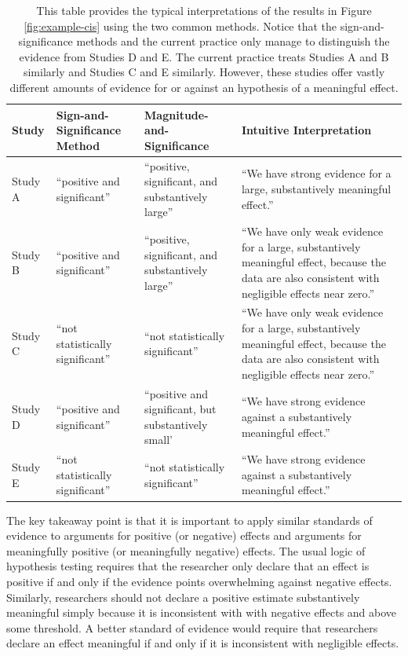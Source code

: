 \documentclass[12pt]{article}
\begin{document}
\renewcommand{\arraystretch}{1.5}
\begin{table}
\begin{center}
\begin{scriptsize}
\begin{tabular}{|>{\centering\arraybackslash}m{.5in}>{\centering\arraybackslash}m{1.75in}>{\centering\arraybackslash}m{1.75in}>{\centering\arraybackslash}
m{1.75in}|}
\hline
Study & Sign-and-Significance Method & Magnitude-and-Significance & Intuitive Interpretation\\ 
\hline
Study A & ``positive and significant'' & ``positive, significant, and substantively large'' & ``We have strong evidence for a large, substantively meaningful effect.''\\
Study B & ``positive and significant'' & ``positive, significant, and substantively large'' & ``We have only weak evidence for a large, substantively meaningful effect, because the data are also consistent with negligible effects near zero.''\\
Study C & ``not statistically significant'' & ``not statistically significant'' & ``We have only weak evidence for a large, substantively meaningful effect, because the data are also consistent with negligible effects near zero.''\\
Study D & ``positive and significant'' & ``positive and significant, but substantively small' & ``We have strong evidence against a substantively meaningful effect.''\\
Study E & ``not statistically significant'' & ``not statistically significant'' & ``We have strong evidence against a substantively meaningful effect.''\\
\hline
\end{tabular}\caption{This table provides the typical interpretations of the results in Figure \ref{fig:example-cis} using the two common methods. Notice that the sign-and-significance methods and the current practice only manage to distinguish the evidence from Studies D and E. The current practice treats Studies A and B similarly and Studies C and E similarly. However, these studies offer vastly different amounts of evidence for or against an hypothesis of a meaningful effect.}\label{tab:example-cis}
\end{scriptsize}
\end{center}
\end{table}

The key takeaway point is that it is important to apply similar standards of evidence to arguments for positive (or negative) effects and arguments for meaningfully positive (or meaningfully negative) effects. The usual logic of hypothesis testing requires that the researcher only declare that an effect is positive if and only if the evidence points overwhelming against negative effects. Similarly, researchers should not declare a positive estimate substantively meaningful simply because it is inconsistent with with negative effects and above some threshold. A better standard of evidence would require that researchers declare an effect meaningful if and only if it is inconsistent with negligible effects.
\end{document}
